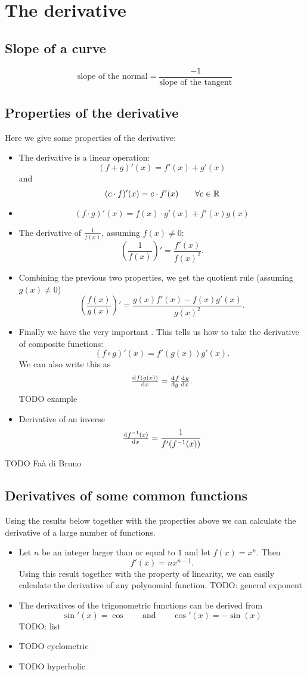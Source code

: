 \section{The derivative}
\subsection{Slope of a curve}
\[ \text{slope of the normal} = \frac{-1}{\text{slope of the tangent}} \]

\subsection{Properties of the derivative}
Here we give some properties of the derivative:
\begin{itemize}
\item The derivative is a linear operation:
\[ (f+g)'(x) = f'(x) + g'(x) \]
and
\[ (c\cdot f)'(x) = c\cdot f'(x) \qquad \forall c \in \mathbb{R} \]
\item {}
\[ (f\cdot g)'(x) = f(x)\cdot g'(x) + f'(x)g(x) \]
\item The derivative of $\frac{1}{f(x)}$, assuming $f(x) \neq 0$:
\[ \left(\frac{1}{f(x)}\right)' = \frac{f'(x)}{f(x)^2}. \]
\item Combining the previous two properties, we get the quotient rule (assuming $g(x)\neq 0$)
\[ \left(\frac{f(x)}{g(x)}\right)' = \frac{g(x)f'(x) - f(x)g'(x)}{g(x)^2}. \]
\item Finally we have the very important . This tells us how to take the derivative of composite functions:
\[ (f \circ g)'(x) = f'(g(x))g'(x). \]
We can also write this as
\[ \od{f(g(x))}{x} = \od{f}{g}\od{g}{x}. \]
TODO example
\item Derivative of an inverse
\[ \od{f^{-1}(x)}{x} = \frac{1}{f'(f^{-1}(x))} \]
\end{itemize}

TODO Faà di Bruno

\subsection{Derivatives of some common functions}
Using the results below together with the properties above we can calculate the derivative of a large number of functions.

\begin{itemize}
\item Let $n$ be an integer larger than or equal to $1$ and let $f(x) = x^n$. Then
\[ f'(x) = n x^{n-1}. \]
Using this result together with the property of linearity, we can easily calculate the derivative of any polynomial function. TODO: general exponent
\item The derivatives of the trigonometric functions can be derived from
\[ \sin'(x) = \cos \qquad \text{and} \qquad \cos'(x) = -\sin(x) \]
TODO: list
\item TODO cyclometric
\item TODO hyperbolic
\end{itemize}

